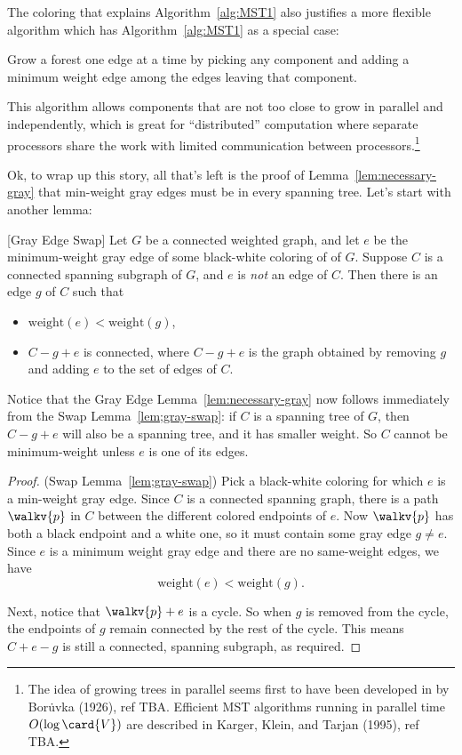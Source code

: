 The coloring that explains Algorithm~\ref{alg:MST1} also justifies a more
flexible algorithm which has Algorithm~\ref{alg:MST1} as a special case:
\begin{algorithm}\label{alg:MST3}
  Grow a forest one edge at a time by picking any component and adding a
  minimum weight edge among the edges leaving that component.
\end{algorithm}
This algorithm allows components that are not too close to grow in
parallel and independently, which is great for ``distributed''
computation where separate processors share the work with limited
communication between processors.\footnote{The idea of growing trees
  in parallel seems first to have been developed in by Bor\.{u}vka
  (1926), ref TBA.  Efficient MST algorithms running in parallel time
  $O(\log \card{V})$ are described in Karger, Klein, and Tarjan
  (1995), ref TBA.}

Ok, to wrap up this story, all that's left is the proof of
Lemma~\ref{lem:necessary-gray} that min-weight gray edges must be in
every spanning tree.   Let's start with another lemma:

\begin{lemma}\label{lem;gray-swap}[Gray Edge Swap]
Let $G$ be a connected weighted graph, and let $e$ be the
minimum-weight gray edge of some black-white coloring of of $G$.
Suppose $C$ is a connected spanning subgraph of $G$, and $e$ is
\emph{not} an edge of $C$.  Then there is an edge $g$ of $C$ such that
\begin{itemize}
\item $\text{weight}(e) <  \text{weight}(g)$,

\item $C - g + e$ is connected, where $C - g + e$ is the graph
  obtained by removing $g$ and adding $e$ to the set of edges of $C$.
\end{itemize}
\end{lemma}

Notice that the Gray Edge Lemma~\ref{lem:necessary-gray} now follows
immediately from the Swap Lemma~\ref{lem;gray-swap}: if $C$ is a
spanning tree of $G$, then $C - g + e$ will also be a spanning tree,
and it has smaller weight.  So $C$ cannot be minimum-weight unless $e$
is one of its edges.

\begin{proof}(Swap Lemma~\ref{lem;gray-swap})
Pick a black-white coloring for which $e$ is a min-weight gray edge.
Since $C$ is a connected spanning graph, there is a path $\walkv{p}$
in $C$ between the different colored endpoints of $e$.  Now
$\walkv{p}$ has both a black endpoint and a white one, so it must
contain some gray edge $g \neq e$.  Since $e$ is a minimum weight gray
edge and there are no same-weight edges, we have
\[
\text{weight}(e) < \text{weight}(g).
\]

Next, notice that $\walkv{p} + e$ is a cycle.  So when $g$ is removed
from the cycle, the endpoints of $g$ remain connected by the rest of
the cycle.  This means $C+e-g$ is still a connected, spanning
subgraph, as required.
\end{proof}


